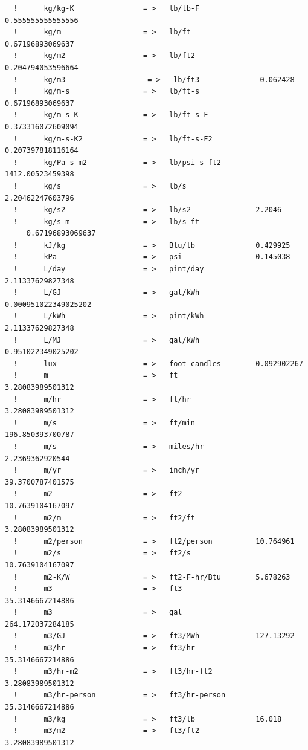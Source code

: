 \begin{lstlisting}
  !      kg/kg-K                = >   lb/lb-F             0.555555555555556
  !      kg/m                   = >   lb/ft               0.67196893069637
  !      kg/m2                  = >   lb/ft2              0.204794053596664
  !      kg/m3                   = >   lb/ft3              0.062428
  !      kg/m-s                 = >   lb/ft-s             0.67196893069637
  !      kg/m-s-K               = >   lb/ft-s-F           0.373316072609094
  !      kg/m-s-K2              = >   lb/ft-s-F2          0.207397818116164
  !      kg/Pa-s-m2             = >   lb/psi-s-ft2        1412.00523459398
  !      kg/s                   = >   lb/s                2.20462247603796
  !      kg/s2                  = >   lb/s2               2.2046
  !      kg/s-m                 = >   lb/s-ft             0.67196893069637
  !      kJ/kg                  = >   Btu/lb              0.429925
  !      kPa                    = >   psi                 0.145038
  !      L/day                  = >   pint/day            2.11337629827348
  !      L/GJ                   = >   gal/kWh             0.000951022349025202
  !      L/kWh                  = >   pint/kWh            2.11337629827348
  !      L/MJ                   = >   gal/kWh             0.951022349025202
  !      lux                    = >   foot-candles        0.092902267
  !      m                      = >   ft                  3.28083989501312
  !      m/hr                   = >   ft/hr               3.28083989501312
  !      m/s                    = >   ft/min              196.850393700787
  !      m/s                    = >   miles/hr            2.2369362920544
  !      m/yr                   = >   inch/yr             39.3700787401575
  !      m2                     = >   ft2                 10.7639104167097
  !      m2/m                   = >   ft2/ft              3.28083989501312
  !      m2/person              = >   ft2/person          10.764961
  !      m2/s                   = >   ft2/s               10.7639104167097
  !      m2-K/W                 = >   ft2-F-hr/Btu        5.678263
  !      m3                     = >   ft3                 35.3146667214886
  !      m3                     = >   gal                 264.172037284185
  !      m3/GJ                  = >   ft3/MWh             127.13292
  !      m3/hr                  = >   ft3/hr              35.3146667214886
  !      m3/hr-m2               = >   ft3/hr-ft2          3.28083989501312
  !      m3/hr-person           = >   ft3/hr-person       35.3146667214886
  !      m3/kg                  = >   ft3/lb              16.018
  !      m3/m2                  = >   ft3/ft2             3.28083989501312

\end{lstlisting}
